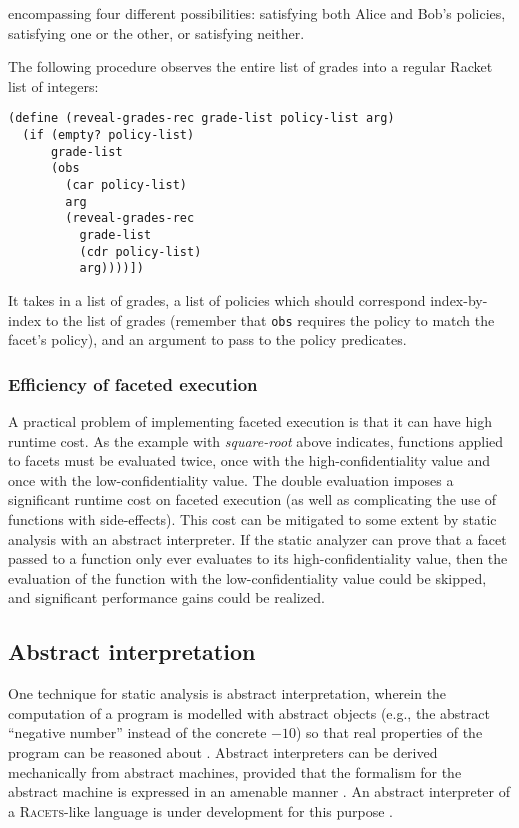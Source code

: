 \documentclass{article}
\begin{document}
encompassing four different possibilities: satisfying both Alice and Bob's policies, satisfying one or the other, or satisfying neither.

The following procedure observes the entire list of grades into a regular Racket list of integers:

\begin{lstlisting}
(define (reveal-grades-rec grade-list policy-list arg)
  (if (empty? policy-list)
      grade-list
      (obs
        (car policy-list)
        arg
        (reveal-grades-rec
          grade-list
          (cdr policy-list)
          arg))))])
\end{lstlisting}

It takes in a list of grades, a list of policies which should correspond index-by-index to the list of grades (remember that \texttt{obs} requires the policy to match the facet's policy), and an argument to pass to the policy predicates.

\subsubsection{Efficiency of faceted execution}
A practical problem of implementing faceted execution is that it can have high runtime cost. As the example with \textit{square-root} above indicates, functions applied to facets must be evaluated twice, once with the high-confidentiality value and once with the low-confidentiality value. The double evaluation imposes a significant runtime cost on faceted execution (as well as complicating the use of functions with side-effects). This cost can be mitigated to some extent by static analysis with an abstract interpreter. If the static analyzer can prove that a facet passed to a function only ever evaluates to its high-confidentiality value, then the evaluation of the function with the low-confidentiality value could be skipped, and significant performance gains could be realized.

\subsection{Abstract interpretation}
One technique for static analysis is abstract interpretation, wherein the computation of a program is modelled with abstract objects (e.g., the abstract ``negative number'' instead of the concrete $-10$) so that real properties of the program can be reasoned about \cite{ai-original}. Abstract interpreters can be derived mechanically from abstract machines, provided that the formalism for the abstract machine is expressed in an amenable manner \cite{aam}. An abstract interpreter of a \textsc{Racets}-like language is under development for this purpose \cite{abstract-inter}.
\end{document}
